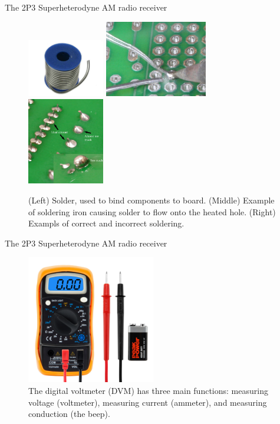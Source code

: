 \documentclass{beamer}
\begin{document}
\begin{frame}{The 2P3 Superheterodyne AM radio receiver}
\begin{figure}
\centering
\includegraphics[width=0.3\textwidth,trim=0cm 0cm 2cm 0cm,clip=true]{figures/solder.png}
\includegraphics[width=0.4\textwidth]{figures/solder3.png}
\includegraphics[width=0.3\textwidth]{figures/solder2.png}
\caption{\label{fig:soldering} (Left) Solder, used to bind components to board.  (Middle) Example of soldering iron causing solder to flow onto the heated hole. (Right) Exampls of correct and incorrect soldering.}
\end{figure}
\end{frame}

\begin{frame}{The 2P3 Superheterodyne AM radio receiver}
\begin{figure}
\centering
\includegraphics[width=0.5\textwidth]{figures/dvm.jpg}
\caption{\label{fig:dvm} The digital voltmeter (DVM) has three main functions: measuring voltage (voltmeter), measuring current (ammeter), and measuring conduction (the beep).}
\end{figure}
\end{frame}
\end{document}
